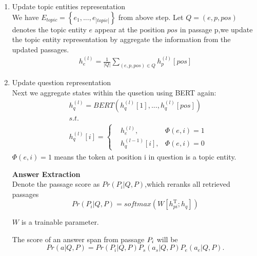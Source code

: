 \documentclass[sigconf]{acmart}
\begin{document}
\begin{enumerate}[(1)]
	    \item Update topic entities representation\\
	    We have $E_{topic}=\left\{e_1,...,e_{|topic|}\right\}$ from above step. 
	    Let $Q = \left(e,p,pos\right)$ denotes the topic entity $e$ appear at the position $pos$ in passage p,we update the topic entity representation by aggregate the information from the updated passages.
	    \begin{displaymath}
	    	\begin{aligned}
	    		h^{(l)}_{e} = \frac{1}{|Q|}\sum\limits_{(e,p,pos) \in Q} h_p^{(l)}[pos]
    		\end{aligned}
   		\end{displaymath}
   	
   		\item Update question representation\\
	    Next we aggregate states within the qusetion using BERT again:
	    \begin{displaymath}
	    	\begin{aligned}
	    		&h_{q}^{(l)} = BERT(h_q^{(l)}[1],...,h_q^{(l)}[pos])\\
	    		&s.t.\\
	    		&h_q^{(l)}[i] = \left\{
	    		\begin{aligned}
		    		&h^{(l)}_{e}  		 , & {\Phi(e,i) = 1} \\
		    		&h_q^{(l-1)}[i]     ,& { \Phi(e,i) = 0 }
		    	\end{aligned}
	    		\right.
	    	\end{aligned}
	    \end{displaymath}
    	$\Phi(e,i)=1$ means the token at position i in question  is a topic entity.
		

	
	\textbf{ Answer Extraction }\\		
		Denote the passage score as $Pr(P_i|Q, P)$,which reranks all retrieved passages
			\begin{displaymath}
				Pr(P_i|Q, P) = softmax( W[h_{pi}^\mathrm{ T };h_q] )
			\end{displaymath}
				
		$W$ is a trainable parameter.
		
		The score of an answer span from passage $\MakeUppercase{p}_i$ will be
				\begin{displaymath}
				Pr(a| Q, P) = 	Pr(P_i|Q, P)P_s(a_s|Q, P)P_e(a_e|Q, P).
				\end{displaymath}
		
	\end{enumerate} 
   
   	

	
	
	
	
	
	
\end{document}
